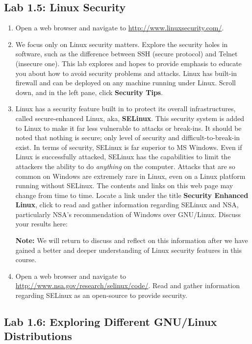 \subsection*{Lab 1.5: Linux Security}
\begin{enumerate}
\item Open a web browser and navigate to {\url{http://www.linuxsecurity.com/}}.
\item We focus only on Linux security matters. Explore the security holes in software, such as the difference between SSH (secure protocol) and Telnet (insecure one). This lab explores and hopes to provide emphasis to educate you about how to avoid security problems and attacks. Linux has built-in firewall and can be deployed on any machine running under Linux.  Scroll down, and in the left pane, click {\bf{Security Tips}}.

\item Linux has a security feature built in to protect its overall infrastructures, called secure-enhanced Linux, aka, {\bf{SELinux}}. This security system is added to Linux to make it far less vulnerable to attacks or break-ins. It should be noted that nothing is secure; only level of security and difficult-to-break-in exist. In terms of security, SELinux is far superior to MS Windows. Even if Linux is successfully attacked, SELinux has the capabilities to limit the attackers the ability to do {\it{anything}} on the computer. Attacks that are so common on Windows are extremely rare in Linux, even on a Linux platform running without SELinux. The contents and links on this web page may change from time to time. Locate a link under the title {\bf{Security Enhanced Linux}}, click to read and gather information regarding SELinux and NSA, particularly NSA's recommendation of Windows over GNU/Linux. Discuss your results here:

\vspace{1.25in}

{\bf{Note:}} We will return to discuss and reflect on this information after we have gained a better and deeper understanding of Linux security features in this course.  

\item Open a web browser and navigate to {\url{http://www.nsa.gov/research/selinux/code/}}. Read and gather information regarding SELinux as an open-source to provide security.  

\end{enumerate}

\subsection*{Lab 1.6: Exploring Different GNU/Linux Distributions} 


